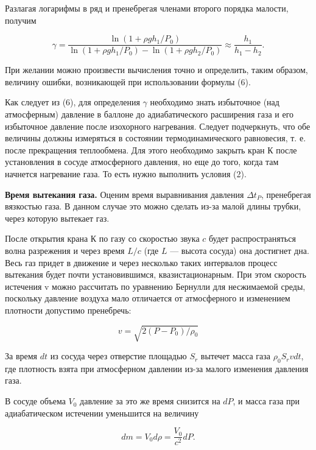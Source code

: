 \documentclass[a4paper,12pt]{article} %
\begin{document}
\noindent Разлагая логарифмы в ряд и пренебрегая членами второго порядка малости, получим

	\begin{equation}
		\gamma = \frac{\ln(1 + \rho gh_{1}/P_{0})}{\ln(1 + \rho gh_{1}/P_{0}) - \ln(1 + \rho gh_{2}/P_{0})} \approx \frac{h_{1}}{h_{1} - h_{2}}.
	\end{equation}

При желании можно произвести вычисления точно и определить, таким образом, величину ошибки, возникающей при использовании формулы (6).


Как следует из (6), для определения $\gamma$ необходимо знать избыточное (над атмосферным) давление в баллоне до адиабатического расширения газа и его избыточное давление после изохорного нагревания. Следует подчеркнуть, что обе величины должны измеряться в состоянии термодинамического равновесия, т. е. после прекращения теплообмена. Для этого необходимо закрыть кран К после установления в сосуде атмосферного давления, но еще до того, когда там начнется нагревание газа. То есть нужно выполнить условия (2). 


\textbf{Время вытекания газа.} Оценим время выравнивания давления $\Delta t_{P}$, пренебрегая вязкостью газа. В данном случае это можно сделать из-за малой длины трубки, через которую вытекает газ.


После открытия крана К по газу со скоростью звука $c$ будет распространяться волна разрежения и через время $L/c$ (где $L$ — высота сосуда) она достигнет дна. Весь газ придет в движение и через несколько таких интервалов процесс вытекания будет почти установившимся, квазистационарным. При этом скорость истечения v можно рассчитать по уравнению Бернулли для несжимаемой среды, поскольку давление воздуха мало отличается от атмосферного и изменением плотности допустимо пренебречь:

	\begin{equation*}
		v = \sqrt{2(P - P_{0})/\rho_{0}}
	\end{equation*}


За время $dt$ из сосуда через отверстие площадью $S_{r}$ вытечет масса газа $\rho_{0}S_{r}vdt$, где плотность взята при атмосферном давлении из-за малого изменения давления газа.


В сосуде объема $V_{0}$ давление за это же время снизится на $dP$, и масса газа при адиабатическом истечении уменьшится на величину

	\begin{equation*}
		dm = V_{0}d\rho = \frac{V_{0}}{c^2}dP.
	\end{equation*}
\end{document}

